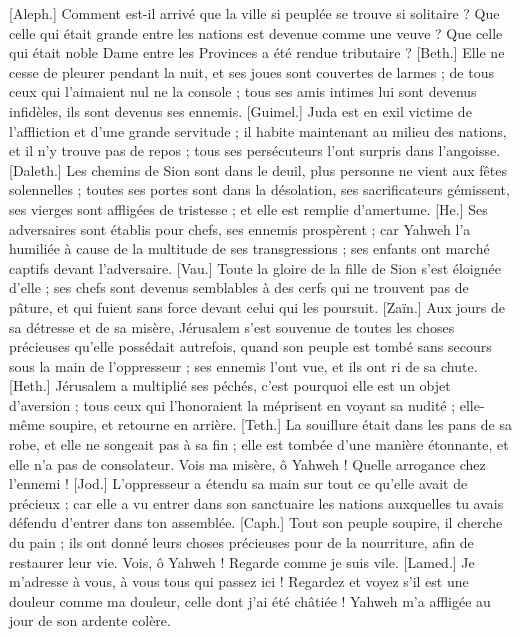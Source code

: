 \begin{multicols}{2}
\VerseOne{}[Aleph.] Comment est-il arrivé que la ville si peuplée se trouve si solitaire ? Que celle qui était grande entre les nations est devenue comme une veuve ? Que celle qui était noble Dame entre les Provinces a été rendue tributaire ?
[Beth.] Elle ne cesse de pleurer pendant la nuit, et ses joues sont couvertes de larmes ; de tous ceux qui l'aimaient nul ne la console ; tous ses amis intimes lui sont devenus infidèles, ils sont devenus ses ennemis.
[Guimel.] Juda est en exil victime de l'affliction et d'une grande servitude ; il habite maintenant au milieu des nations, et il n’y trouve pas de repos ; tous ses persécuteurs l'ont surpris dans l'angoisse.
[Daleth.] Les chemins de Sion sont dans le deuil, plus personne ne vient aux fêtes solennelles ; toutes ses portes sont dans la désolation, ses sacrificateurs gémissent, ses vierges sont affligées de tristesse ; et elle est remplie d'amertume.
[He.] Ses adversaires sont établis pour chefs, ses ennemis prospèrent ; car Yahweh l'a humiliée à cause de la multitude de ses transgressions ; ses enfants ont marché captifs devant l'adversaire.
[Vau.] Toute la gloire de la fille de Sion s'est éloignée d'elle ; ses chefs sont devenus semblables à des cerfs qui ne trouvent pas de pâture, et qui fuient sans force devant celui qui les poursuit.
[Zaïn.] Aux jours de sa détresse et de sa misère, Jérusalem s’est souvenue de toutes les choses précieuses qu’elle possédait autrefois, quand son peuple est tombé sans secours sous la main de l’oppresseur ; ses ennemis l’ont vue, et ils ont ri de sa chute.
[Heth.] Jérusalem a multiplié ses péchés, c'est pourquoi elle est un objet d'aversion ; tous ceux qui l'honoraient la méprisent en voyant sa nudité ; elle-même soupire, et retourne en arrière.
[Teth.] La souillure était dans les pans de sa robe, et elle ne songeait pas à sa fin ; elle est tombée d'une manière étonnante, et elle n'a pas de consolateur. Vois ma misère, ô Yahweh ! Quelle arrogance chez l'ennemi !
[Jod.] L’oppresseur a étendu sa main sur tout ce qu’elle avait de précieux ; car elle a vu entrer dans son sanctuaire les nations auxquelles tu avais défendu d’entrer dans ton assemblée.
[Caph.] Tout son peuple soupire, il cherche du pain ; ils ont donné leurs choses précieuses pour de la nourriture, afin de restaurer leur vie. Vois, ô Yahweh ! Regarde comme je suis vile.
[Lamed.] Je m'adresse à vous, à vous tous qui passez ici ! Regardez et voyez s'il est une douleur comme ma douleur, celle dont j'ai été châtiée ! Yahweh m'a affligée au jour de son ardente colère.

\end{multicols}
